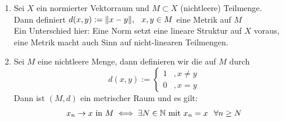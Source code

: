\begin{beispiel}
	\begin{enumerate}[label=\alph*\upshape)]
		\item Sei $X$ ein normierter Vektorraum und $M \subset X$ (nichtleere) Teilmenge. \\
		Dann definiert $d(x, y) := \| x - y\|, \hspace{0.25cm} x, y \in M$ eine Metrik auf $M$ \\
		Ein Unterschied hier: Eine Norm setzt eine lineare Struktur auf $X$ voraus, eine Metrik macht auch Sinn auf nicht-linearen Teilmengen.
		\item \label{bsp:1-diskreteMetrik} Sei $M$ eine nichtleere Menge, dann definieren wir die  auf $M$ durch
			\[ d(x, y) := \begin{cases}1 &, x \neq y \\ 0 &, x = y\end{cases} \]
			Dann ist $(M, d)$ ein metrischer Raum und es gilt: 
				\[ x_{n} \rightarrow x \text{ in } M \iff \exists N \in \mathbb{N} \text{ mit } x_{n} = x \hspace{0.25cm} \forall n \geq N \]
	\end{enumerate}	
\end{beispiel}

